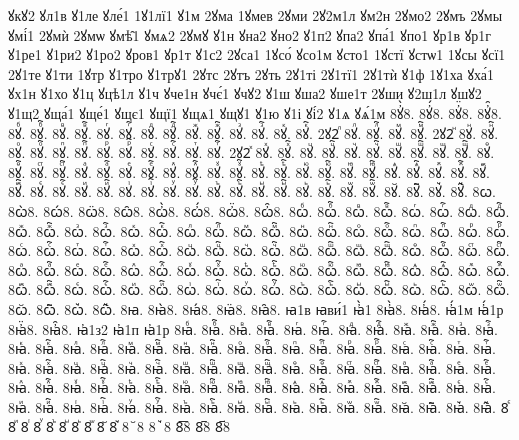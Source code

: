 {ꙋкꙋ2
ꙋл1в
ꙋ1ле
ꙋле́1
1ꙋ1лї1
ꙋ1м
2ꙋма
1ꙋмев
2ꙋми
2ꙋ2м1л
ꙋм2н
2ꙋмо2
2ꙋмъ
2ꙋмы
ꙋмі́1
2ꙋмѝ
2ꙋмѡ
ꙋмѣ̑1
ꙋмѧ2
2ꙋмꙋ
ꙋ1н
ꙋна2
ꙋно2
ꙋ1п2
ꙋпа2
ꙋпа́1
ꙋпо1
ꙋр1в
ꙋр1г
ꙋ1ре1
ꙋ1ри2
ꙋ1ро2
ꙋров1
ꙋр1т
ꙋ1с2
2ꙋса1
1ꙋсо́
ꙋсо1м
ꙋсто1
1ꙋстї
ꙋстѡ1
1ꙋсы
ꙋсї1
2ꙋ1те
ꙋ1ти
1ꙋтр
ꙋ1тро
ꙋ1трꙋ1
2ꙋтс
2ꙋтъ
2ꙋть
2ꙋ1ті
2ꙋ1тї1
2ꙋ1тѝ
ꙋ1ф
1ꙋ1ха
ꙋха́1
ꙋх1н
ꙋ1хо
ꙋ1ц
ꙋцѣ1л
ꙋ1ч
ꙋче1н
ꙋчє́1
ꙋчꙋ2
ꙋ1ш
ꙋша2
ꙋше1т
2ꙋши
ꙋ2ш1л
ꙋшꙋ2
ꙋ1щ2
ꙋща́1
ꙋще́1
ꙋщє1
ꙋщї1
ꙋщѧ1
ꙋщꙋ1
ꙋ1ю
ꙋ1і
ꙋі́2
ꙋ1ѧ
ꙋѧ́1м
8ꙋ҆̀8.
8ꙋ҆́8.
8ꙋ҆̈8.
8ꙋ҆̑8.
8ꙋⷠ.
8ꙋⷠ҇.
8ꙋⷡ.
8ꙋⷡ҇.
8ꙋⷢ.
8ꙋⷢ҇.
8ꙋⷣ.
8ꙋⷣ҇.
8ꙋⷤ.
8ꙋⷤ҇.
8ꙋⷥ.
8ꙋⷥ҇.
8ꙋⷦ.
8ꙋⷦ҇.
2ꙋ2ⷧ
8ꙋⷧ.
8ꙋⷧ҇.
8ꙋⷨ.
8ꙋⷨ҇.
2ꙋ2ⷩ
8ꙋⷩ.
8ꙋⷩ҇.
8ꙋⷪ.
8ꙋⷪ҇.
8ꙋⷫ.
8ꙋⷫ҇.
8ꙋⷬ.
8ꙋⷬ҇.
8ꙋⷭ.
8ꙋⷭ҇.
8ꙋⷮ.
8ꙋⷮ҇.
2ꙋ2ⷯ
8ꙋⷯ.
8ꙋⷯ҇.
8ꙋⷰ.
8ꙋⷰ҇.
8ꙋⷱ.
8ꙋⷱ҇.
8ꙋⷲ.
8ꙋⷲ҇.
8ꙋⷳ.
8ꙋⷳ҇.
8ꙋⷴ.
8ꙋⷴ҇.
8ꙋⷵ.
8ꙋⷵ҇.
8ꙋⷶ.
8ꙋⷶ҇.
8ꙋⷷ.
8ꙋⷷ҇.
8ꙋⷸ.
8ꙋⷸ҇.
8ꙋⷹ.
8ꙋⷹ҇.
8ꙋⷺ.
8ꙋⷺ҇.
8ꙋⷻ.
8ꙋⷻ҇.
8ꙋⷼ.
8ꙋⷼ҇.
8ꙋⷽ.
8ꙋⷽ҇.
8ꙋⷾ.
8ꙋⷾ҇.
8ꙋⷿ.
8ꙋⷿ҇.
8ꙋꙴ.
8ꙋꙴ҇.
8ꙋꙵ.
8ꙋꙵ҇.
8ꙋꙶ.
8ꙋꙶ҇.
8ꙋꙷ.
8ꙋꙷ҇.
8ꙋꙸ.
8ꙋꙸ҇.
8ꙋꙹ.
8ꙋꙹ҇.
8ꙋꙺ.
8ꙋꙺ҇.
8ꙋꙻ.
8ꙋꙻ҇.
8ꙋ꙼.
8ꙋ꙼҇.
8ꙋ꙽.
8ꙋ꙽҇.
8ꙍ.
8ꙍ̀8.
8ꙍ́8.
8ꙍ̈8.
8ꙍ̑8.
8ꙍ҆̀8.
8ꙍ҆́8.
8ꙍ҆̈8.
8ꙍ҆̑8.
8ꙍⷠ.
8ꙍⷠ҇.
8ꙍⷡ.
8ꙍⷡ҇.
8ꙍⷢ.
8ꙍⷢ҇.
8ꙍⷣ.
8ꙍⷣ҇.
8ꙍⷤ.
8ꙍⷤ҇.
8ꙍⷥ.
8ꙍⷥ҇.
8ꙍⷦ.
8ꙍⷦ҇.
8ꙍⷧ.
8ꙍⷧ҇.
8ꙍⷨ.
8ꙍⷨ҇.
8ꙍⷩ.
8ꙍⷩ҇.
8ꙍⷪ.
8ꙍⷪ҇.
8ꙍⷫ.
8ꙍⷫ҇.
8ꙍⷬ.
8ꙍⷬ҇.
8ꙍⷭ.
8ꙍⷭ҇.
8ꙍⷮ.
8ꙍⷮ҇.
8ꙍⷯ.
8ꙍⷯ҇.
8ꙍⷰ.
8ꙍⷰ҇.
8ꙍⷱ.
8ꙍⷱ҇.
8ꙍⷲ.
8ꙍⷲ҇.
8ꙍⷳ.
8ꙍⷳ҇.
8ꙍⷴ.
8ꙍⷴ҇.
8ꙍⷵ.
8ꙍⷵ҇.
8ꙍⷶ.
8ꙍⷶ҇.
8ꙍⷷ.
8ꙍⷷ҇.
8ꙍⷸ.
8ꙍⷸ҇.
8ꙍⷹ.
8ꙍⷹ҇.
8ꙍⷺ.
8ꙍⷺ҇.
8ꙍⷻ.
8ꙍⷻ҇.
8ꙍⷼ.
8ꙍⷼ҇.
8ꙍⷽ.
8ꙍⷽ҇.
8ꙍⷾ.
8ꙍⷾ҇.
8ꙍⷿ.
8ꙍⷿ҇.
8ꙍꙴ.
8ꙍꙴ҇.
8ꙍꙵ.
8ꙍꙵ҇.
8ꙍꙶ.
8ꙍꙶ҇.
8ꙍꙷ.
8ꙍꙷ҇.
8ꙍꙸ.
8ꙍꙸ҇.
8ꙍꙹ.
8ꙍꙹ҇.
8ꙍꙺ.
8ꙍꙺ҇.
8ꙍꙻ.
8ꙍꙻ҇.
8ꙍ꙼.
8ꙍ꙼҇.
8ꙍ꙽.
8ꙍ꙽҇.
8ꙗ.
8ꙗ̀8.
8ꙗ́8.
8ꙗ̈8.
8ꙗ̑8.
ꙗ1в
ꙗви́1
ꙗ҆̀1
8ꙗ҆̀8.
8ꙗ҆́8.
ꙗ҆́1м
ꙗ҆́1р
8ꙗ҆̈8.
8ꙗ҆̑8.
ꙗ҆1з2
ꙗ҆1п
ꙗ҆1р
8ꙗⷠ.
8ꙗⷠ҇.
8ꙗⷡ.
8ꙗⷡ҇.
8ꙗⷢ.
8ꙗⷢ҇.
8ꙗⷣ.
8ꙗⷣ҇.
8ꙗⷤ.
8ꙗⷤ҇.
8ꙗⷥ.
8ꙗⷥ҇.
8ꙗⷦ.
8ꙗⷦ҇.
8ꙗⷧ.
8ꙗⷧ҇.
8ꙗⷨ.
8ꙗⷨ҇.
8ꙗⷩ.
8ꙗⷩ҇.
8ꙗⷪ.
8ꙗⷪ҇.
8ꙗⷫ.
8ꙗⷫ҇.
8ꙗⷬ.
8ꙗⷬ҇.
8ꙗⷭ.
8ꙗⷭ҇.
8ꙗⷮ.
8ꙗⷮ҇.
8ꙗⷯ.
8ꙗⷯ҇.
8ꙗⷰ.
8ꙗⷰ҇.
8ꙗⷱ.
8ꙗⷱ҇.
8ꙗⷲ.
8ꙗⷲ҇.
8ꙗⷳ.
8ꙗⷳ҇.
8ꙗⷴ.
8ꙗⷴ҇.
8ꙗⷵ.
8ꙗⷵ҇.
8ꙗⷶ.
8ꙗⷶ҇.
8ꙗⷷ.
8ꙗⷷ҇.
8ꙗⷸ.
8ꙗⷸ҇.
8ꙗⷹ.
8ꙗⷹ҇.
8ꙗⷺ.
8ꙗⷺ҇.
8ꙗⷻ.
8ꙗⷻ҇.
8ꙗⷼ.
8ꙗⷼ҇.
8ꙗⷽ.
8ꙗⷽ҇.
8ꙗⷾ.
8ꙗⷾ҇.
8ꙗⷿ.
8ꙗⷿ҇.
8ꙗꙴ.
8ꙗꙴ҇.
8ꙗꙵ.
8ꙗꙵ҇.
8ꙗꙶ.
8ꙗꙶ҇.
8ꙗꙷ.
8ꙗꙷ҇.
8ꙗꙸ.
8ꙗꙸ҇.
8ꙗꙹ.
8ꙗꙹ҇.
8ꙗꙺ.
8ꙗꙺ҇.
8ꙗꙻ.
8ꙗꙻ҇.
8ꙗ꙼.
8ꙗ꙼҇.
8ꙗ꙽.
8ꙗ꙽҇.
8ꙴ
8ꙵ
8ꙶ
8ꙷ
8ꙸ
8ꙹ
8ꙺ
8ꙻ
8꙼
8꙽
8꙾8
8ꙿ8
8︦8
8︮8
8︯8
}
